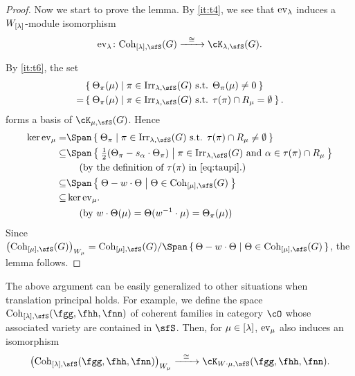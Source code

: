 \documentclass[counting_main.tex]{subfiles}
\begin{document}
\begin{proof}
  Now we start to prove the lemma. By \ref{it:t4}, we see that ${\mathrm{ev}_{\lambda}}$
  induces a $W_{{[\lambda]}}$-module isomorphism
  \[
    \ev{\lambda} \colon \Coh_{[\lambda],\sfS}(G) \xrightarrow{\ \ \cong \ \ } \Grt_{\lambda,\sfS}(G).
  \]

  By \ref{it:t6}, the set %
  \[
    \begin{split}
      & \Set{\Theta_{\pi}(\mu)| \pi\in \Irr_{\lambda, \sfS}(G)
        \text{ s.t. } \Theta_{\pi}(\mu)\neq 0} \\
      = & \Set{\Theta_{\pi}(\mu)| \pi\in \Irr_{\lambda, \sfS}(G) \text{ s.t.
        } \tau(\pi)\cap R_{\mu}= \emptyset}.
    \end{split}
  \]
  forms a basis of $\Grt_{\mu,\sfS}(G)$.  Hence
  \[
    \begin{split}
      \ker \ev{\mu} = & \Span \Set{\Theta_{\pi}| \pi\in \Irr_{\lambda, \sfS}(G) \text{
          s.t. }
        \tau(\pi)\cap R_{\mu}\neq \emptyset}\\
      \subseteq & \Span \Set{\half(\Theta_\pi - s_{\alpha}\cdot \Theta_{\pi}) | \pi\in \Irr_{\lambda, \sfS}(G) \text{
          and } \alpha \in
        \tau(\pi)\cap R_{\mu}}\\
      & \ \ \ \  \text{(by the definition of $\tau(\pi)$ in \eqref{eq:taupi}.)} \\
      \subseteq &\Span\Set{\Theta- w\cdot \Theta |\Theta\in \Coh_{[\mu],\sfS}(G)} \\
      \subseteq & \ker \ev{\mu}. \\
      &\ \ \ \ \text{(by
        $w\cdot \Theta(\mu) = \Theta(w^{-1}\cdot \mu)=\Theta_\pi(\mu)$)}
    \end{split}
  \]
  Since
  $\left(\Coh_{[\mu],\sfS}(G)\right)_{W_{\mu}} =\Coh_{[\mu],\sfS}(G)\slash \Span\set{\Theta- w\cdot \Theta |\Theta\in \Coh_{[\mu],\sfS}(G)} $,
  the lemma follows.
\end{proof}

\begin{remark}
  The above argument can be easily generalized to other situations when
  translation principal holds. For example, we define the space
  $\Coh_{\Lam,\sfS}(\fgg,\fhh,\fnn)$ of coherent families in category $\cO$
  whose associated variety are contained in $\sfS$. Then, for $\mu\in {[\lambda]}$,
  ${\mathrm{ev}_{\mu}}$ also induces an isomorphism
  \[
    \left(\Coh_{[\lambda],\sfS}(\fgg,\fhh,\fnn)\right)_{W_{\mu}} \xrightarrow{\ \ \cong \ \ } \Grt_{W\cdot \mu,\sfS}(\fgg,\fhh,\fnn).
  \]
\end{remark}
\end{document}
